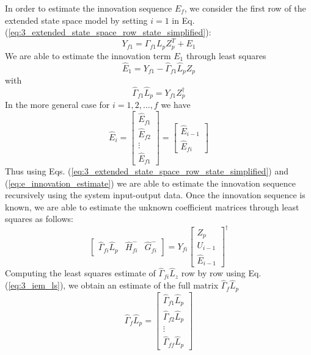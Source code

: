 In order to estimate the innovation sequence $E_f$, we consider the first row of the extended state space model by setting $i = 1$ in Eq. (\ref{eq:3_extended_state_space_row_state_simplified}):
\begin{equation}
Y_{f1} = \Gamma_{f1}L_p Z_p^T + E_{1}
\end{equation}
We are able to estimate the innovation term $E_1$ through least squares
\begin{equation}
\hat{E}_1 = Y_{f1} - \hat{\Gamma}_{f1}\hat{L}_p Z_p
\end{equation}
with
\begin{equation}
\hat{\Gamma}_{f1}\hat{L}_p = Y_{f1} Z_p^\dagger
\end{equation}
In the more general case for $i = 1,2,\dots,f$ we have
\begin{equation}\label{eq:e_innovation_estimate}
\hat{E}_i = \begin{bmatrix}\hat{E}_{f1}\\ \hat{E}_{f2}\\ \vdots \\\hat{E}_{f1}\end{bmatrix} = 
\begin{bmatrix} \hat{E}_{i-1}\\\hat{E}_{fi}\end{bmatrix}
\end{equation}
Thus using Eqs. (\ref{eq:3_extended_state_space_row_state_simplified}) and (\ref{eq:e_innovation_estimate}) we are able to estimate the innovation sequence recursively using the system input-output data. Once the innovation sequence is known, we are able to estimate the unknown coefficient matrices  through least squares as follows:
\begin{equation}\label{eq:3_iem_ls}
\begin{bmatrix}\hat{\Gamma}_{fi}\hat{L}_p & \hat{H}_{fi}^- & \hat{G}_{fi}^-\end{bmatrix} = Y_{fi}
\begin{bmatrix}Z_p\\ U_{i-1}\\ \hat{E}_{i-1}\end{bmatrix}^\dagger
\end{equation}
Computing the least squares estimate of $\hat{\Gamma}_{fi}\hat{L}_z$ row by row using Eq. (\ref{eq:3_iem_ls}), we obtain an estimate of the full matrix $\hat{\Gamma}_f\hat{L}_p$
\begin{equation*}
\hat{\Gamma}_f \hat{L}_p = \begin{bmatrix}
\hat{\Gamma}_{f1}\hat{L}_p\\ \hat{\Gamma}_{f2}\hat{L}_p\\ \vdots \\ \hat{\Gamma}_{ff}\hat{L}_p
\end{bmatrix}
\end{equation*}
